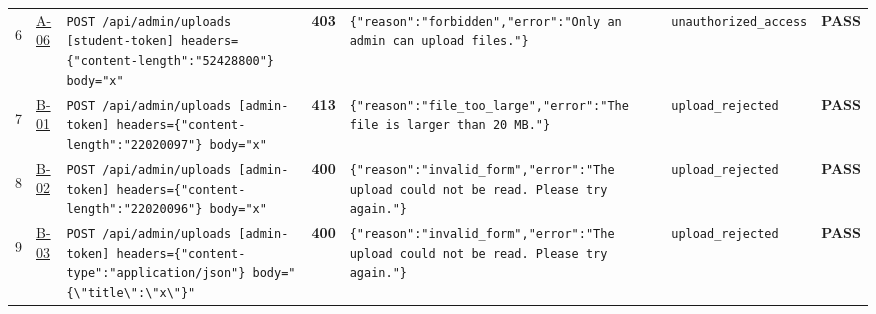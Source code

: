 \documentclass[10pt,a4paper]{article}
\begin{document}
\begin{landscape}
\begin{longtable}{@{}P{0.6cm}P{0.9cm}P{8.5cm}P{1.0cm}P{6.2cm}P{4.2cm}P{1.1cm}@{}}
\hypertarget{call6}{6} & \hyperlink{test-A-06}{A-06} & \texttt{POST /\allowbreak{}api/\allowbreak{}admin/\allowbreak{}uploads [student-\allowbreak{}token] headers=\allowbreak{}\{"\allowbreak{}content-\allowbreak{}length"\allowbreak{}:\allowbreak{}"\allowbreak{}52428800"\allowbreak{}\} body=\allowbreak{}"\allowbreak{}x"\allowbreak{}} & \textcolor{warnamber}{\textbf{403}} & \texttt{\{"\allowbreak{}reason"\allowbreak{}:\allowbreak{}"\allowbreak{}forbidden"\allowbreak{},\allowbreak{}"\allowbreak{}error"\allowbreak{}:\allowbreak{}"\allowbreak{}Only an admin can upload files.\allowbreak{}"\allowbreak{}\}} & \texttt{unauthorized\_\allowbreak{}access} & \textcolor{passgreen}{\textbf{PASS}} \\
\hypertarget{call7}{7} & \hyperlink{test-B-01}{B-01} & \texttt{POST /\allowbreak{}api/\allowbreak{}admin/\allowbreak{}uploads [admin-\allowbreak{}token] headers=\allowbreak{}\{"\allowbreak{}content-\allowbreak{}length"\allowbreak{}:\allowbreak{}"\allowbreak{}22020097"\allowbreak{}\} body=\allowbreak{}"\allowbreak{}x"\allowbreak{}} & \textcolor{warnamber}{\textbf{413}} & \texttt{\{"\allowbreak{}reason"\allowbreak{}:\allowbreak{}"\allowbreak{}file\_\allowbreak{}too\_\allowbreak{}large"\allowbreak{},\allowbreak{}"\allowbreak{}error"\allowbreak{}:\allowbreak{}"\allowbreak{}The file is larger than 20 MB.\allowbreak{}"\allowbreak{}\}} & \texttt{upload\_\allowbreak{}rejected} & \textcolor{passgreen}{\textbf{PASS}} \\
\hypertarget{call8}{8} & \hyperlink{test-B-02}{B-02} & \texttt{POST /\allowbreak{}api/\allowbreak{}admin/\allowbreak{}uploads [admin-\allowbreak{}token] headers=\allowbreak{}\{"\allowbreak{}content-\allowbreak{}length"\allowbreak{}:\allowbreak{}"\allowbreak{}22020096"\allowbreak{}\} body=\allowbreak{}"\allowbreak{}x"\allowbreak{}} & \textcolor{warnamber}{\textbf{400}} & \texttt{\{"\allowbreak{}reason"\allowbreak{}:\allowbreak{}"\allowbreak{}invalid\_\allowbreak{}form"\allowbreak{},\allowbreak{}"\allowbreak{}error"\allowbreak{}:\allowbreak{}"\allowbreak{}The upload could not be read.\allowbreak{} Please try again.\allowbreak{}"\allowbreak{}\}} & \texttt{upload\_\allowbreak{}rejected} & \textcolor{passgreen}{\textbf{PASS}} \\
\hypertarget{call9}{9} & \hyperlink{test-B-03}{B-03} & \texttt{POST /\allowbreak{}api/\allowbreak{}admin/\allowbreak{}uploads [admin-\allowbreak{}token] headers=\allowbreak{}\{"\allowbreak{}content-\allowbreak{}type"\allowbreak{}:\allowbreak{}"\allowbreak{}application/\allowbreak{}json"\allowbreak{}\} body=\allowbreak{}"\allowbreak{}\{\textbackslash{}\allowbreak{}"\allowbreak{}title\textbackslash{}\allowbreak{}"\allowbreak{}:\allowbreak{}\textbackslash{}\allowbreak{}"\allowbreak{}x\textbackslash{}\allowbreak{}"\allowbreak{}\}"\allowbreak{}} & \textcolor{warnamber}{\textbf{400}} & \texttt{\{"\allowbreak{}reason"\allowbreak{}:\allowbreak{}"\allowbreak{}invalid\_\allowbreak{}form"\allowbreak{},\allowbreak{}"\allowbreak{}error"\allowbreak{}:\allowbreak{}"\allowbreak{}The upload could not be read.\allowbreak{} Please try again.\allowbreak{}"\allowbreak{}\}} & \texttt{upload\_\allowbreak{}rejected} & \textcolor{passgreen}{\textbf{PASS}} \\

\end{longtable}
\end{landscape}
\end{document}
